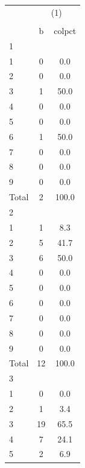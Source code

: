 {
\def\sym#1{\ifmmode^{#1}\else\(^{#1}\)\fi}
\begin{tabular}{l*{1}{cc}}
\hline\hline
            &\multicolumn{2}{c}{(1)}  \\
            &\multicolumn{2}{c}{}     \\
            &           b&      colpct\\
\hline
1           &            &            \\
1           &           0&         0.0\\
2           &           0&         0.0\\
3           &           1&        50.0\\
4           &           0&         0.0\\
5           &           0&         0.0\\
6           &           1&        50.0\\
7           &           0&         0.0\\
8           &           0&         0.0\\
9           &           0&         0.0\\
Total       &           2&       100.0\\
\hline
2           &            &            \\
1           &           1&         8.3\\
2           &           5&        41.7\\
3           &           6&        50.0\\
4           &           0&         0.0\\
5           &           0&         0.0\\
6           &           0&         0.0\\
7           &           0&         0.0\\
8           &           0&         0.0\\
9           &           0&         0.0\\
Total       &          12&       100.0\\
\hline
3           &            &            \\
1           &           0&         0.0\\
2           &           1&         3.4\\
3           &          19&        65.5\\
4           &           7&        24.1\\
5           &           2&         6.9\\

\end{tabular}}
